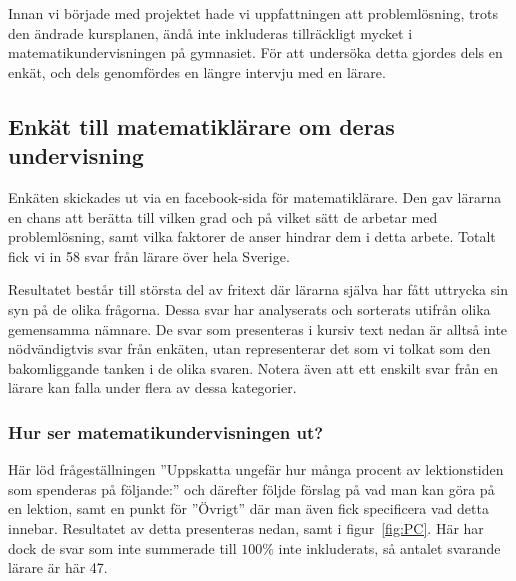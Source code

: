 \textcolor{lila}{Innan vi började med projektet hade vi uppfattningen att problemlösning, trots den ändrade kursplanen, ändå inte inkluderas tillräckligt mycket i matematikundervisningen på gymnasiet. För att undersöka detta gjordes dels en enkät, och dels genomfördes en längre intervju med en lärare.} 

\subsection{Enkät till matematiklärare om deras undervisning}
    \label{sec:Bakgrundsenkat}
    \textcolor{lila}{Enkäten skickades ut via en facebook-sida för matematiklärare. Den gav lärarna en chans att berätta till vilken grad och på vilket sätt de arbetar med problemlösning, samt vilka faktorer de anser hindrar dem i detta arbete. Totalt fick vi in 58 svar från lärare över hela Sverige.}

    \textcolor{lila}{Resultatet består till största del av fritext där lärarna själva har fått uttrycka sin syn på de olika frågorna. Dessa svar har analyserats och sorterats utifrån olika gemensamma nämnare. De svar som presenteras i kursiv text nedan är alltså inte nödvändigtvis svar från enkäten, utan representerar det som vi tolkat som den bakomliggande tanken i de olika svaren. Notera även att ett enskilt svar från en lärare kan falla under flera av dessa kategorier.}

\subsubsection{Hur ser matematikundervisningen ut?}

    \textcolor{lila}{Här löd frågeställningen ''Uppskatta ungefär hur många procent av lektionstiden som spenderas på följande:'' och därefter följde förslag på vad man kan göra på en lektion, samt en punkt för ''Övrigt'' där man även fick specificera vad detta innebar. Resultatet av detta presenteras nedan, samt i figur~\ref{fig:PC}. Här har dock de svar som inte summerade till $100\%$ inte inkluderats, så antalet svarande lärare är här 47.}


